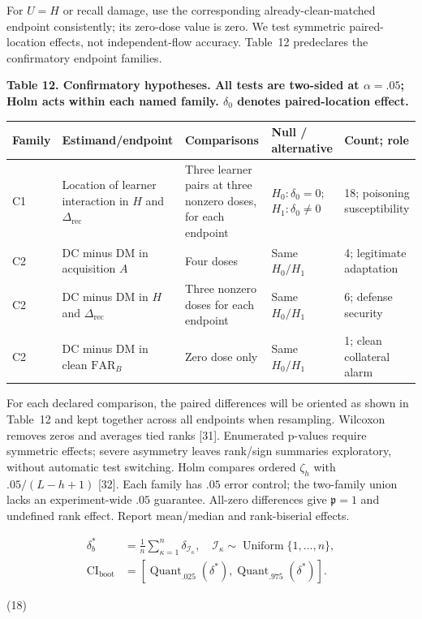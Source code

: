 \documentclass[10pt,a4paper]{article}
\begin{document}
For $U=H$ or recall damage, use the corresponding already-clean-matched endpoint consistently; its zero-dose value is zero. We test symmetric paired-location effects, not independent-flow accuracy. Table~12 predeclares the confirmatory endpoint families.


\centering\footnotesize
\par\textbf{Table 12. Confirmatory hypotheses. All tests are two-sided at $\alpha=.05$; Holm acts within each named family. $\delta_0$ denotes paired-location effect.}\par


\begin{longtable}{p{0.8cm}l l p{2.4cm}p{2.5cm}}
\toprule
Family & Estimand/endpoint & Comparisons & Null / alternative & Count; role\\
\midrule
C1 & Location of learner interaction in $H$ and $\Delta_{\mathrm{rec}}$ & Three learner pairs at three nonzero doses, for each endpoint & $H_0:\delta_0=0$; $H_1:\delta_0\ne0$ & 18; poisoning susceptibility\\
C2 & DC minus DM in acquisition $A$ & Four doses & Same $H_0/H_1$ & 4; legitimate adaptation\\
C2 & DC minus DM in $H$ and $\Delta_{\mathrm{rec}}$ & Three nonzero doses for each endpoint & Same $H_0/H_1$ & 6; defense security\\
C2 & DC minus DM in clean $\mathrm{FAR}_B$ & Zero dose only & Same $H_0/H_1$ & 1; clean collateral alarm\\
\bottomrule
\end{longtable}

For each declared comparison, the paired differences will be oriented as shown in Table~12 and kept together across all endpoints when resampling. Wilcoxon removes zeros and averages tied ranks [31]. Enumerated p-values require symmetric effects; severe asymmetry leaves rank/sign summaries exploratory, without automatic test switching. Holm compares ordered $\zeta_h$ with $.05/(L-h+1)$ [32]. Each family has $.05$ error control; the two-family union lacks an experiment-wide $.05$ guarantee. All-zero differences give $\mathfrak p=1$ and undefined rank effect. Report mean/median and rank-biserial effects.

\begin{equation}
\begin{aligned}
\delta_b^*&=\frac1n\sum_{\kappa=1}^n\delta_{\mathcal I_\kappa},\quad\mathcal I_\kappa\sim\operatorname{Uniform}\{1,\ldots,n\},\\
\mathrm{CI}_{\mathrm{boot}}&=[\operatorname{Quant}_{.025}(\delta^*),\operatorname{Quant}_{.975}(\delta^*)].
\end{aligned}

\end{equation}
\par\hfill(18)\par
\end{document}
